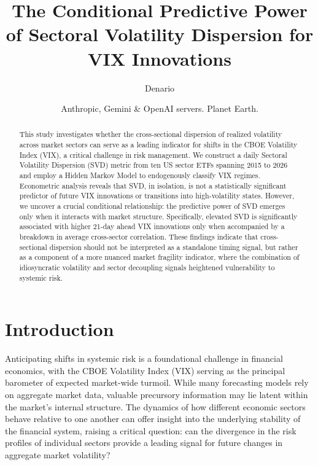\documentclass[]{article}
\begin{document}
\title{The Conditional Predictive Power of Sectoral Volatility Dispersion for VIX Innovations}

\author{Denario}
\date{Anthropic, Gemini \& OpenAI servers. Planet Earth.}

\maketitle
\begin{abstract}
This study investigates whether the cross-sectional dispersion of realized volatility across market sectors can serve as a leading indicator for shifts in the CBOE Volatility Index (VIX), a critical challenge in risk management. We construct a daily Sectoral Volatility Dispersion (SVD) metric from ten US sector ETFs spanning 2015 to 2026 and employ a Hidden Markov Model to endogenously classify VIX regimes. Econometric analysis reveals that SVD, in isolation, is not a statistically significant predictor of future VIX innovations or transitions into high-volatility states. However, we uncover a crucial conditional relationship: the predictive power of SVD emerges only when it interacts with market structure. Specifically, elevated SVD is significantly associated with higher 21-day ahead VIX innovations only when accompanied by a breakdown in average cross-sector correlation. These findings indicate that cross-sectional dispersion should not be interpreted as a standalone timing signal, but rather as a component of a more nuanced market fragility indicator, where the combination of idiosyncratic volatility and sector decoupling signals heightened vulnerability to systemic risk.
\end{abstract}








\section{Introduction}
\label{sec:intro}
Anticipating shifts in systemic risk is a foundational challenge in financial economics, with the CBOE Volatility Index (VIX) serving as the principal barometer of expected market-wide turmoil. While many forecasting models rely on aggregate market data, valuable precursory information may lie latent within the market's internal structure. The dynamics of how different economic sectors behave relative to one another can offer insight into the underlying stability of the financial system, raising a critical question: can the divergence in the risk profiles of individual sectors provide a leading signal for future changes in aggregate market volatility?
\end{document}
